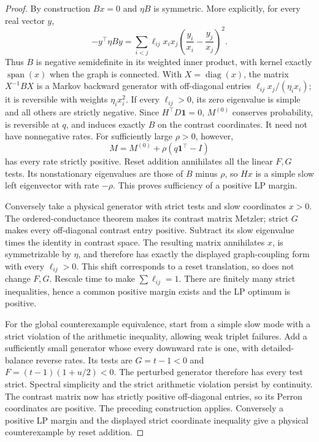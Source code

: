 \documentclass[11pt]{article}
\begin{document}
\begin{proof}
By construction $Bx=0$ and $\eta B$ is symmetric. More explicitly,
for every real vector $y$,
\[
-y^\top\eta B y=\sum_{i<j}\ell_{ij}x_ix_j
 \left(\frac{y_i}{x_i}-\frac{y_j}{x_j}\right)^2.
\]
Thus $B$ is negative semidefinite in its weighted inner product, with
kernel exactly $\operatorname{span}(x)$ when the graph is connected. With
$X=\operatorname{diag}(x)$, the matrix $X^{-1}BX$ is a Markov backward
generator with off-diagonal entries
$\ell_{ij}x_j/(\eta_i x_i)$; it is reversible with weights
$\eta_i x_i^2$. If every $\ell_{ij}>0$, its zero eigenvalue is simple
and all others are strictly negative. Since $H^\top D\mathbf1=0$,
$M^{(0)}$ conserves probability, is reversible at $q$, and induces exactly
$B$ on the contrast coordinates. It need not have nonnegative rates.
For sufficiently large $\rho>0$, however,
\[
M=M^{(0)}+\rho(q\mathbf1^\top-I)
\]
has every rate strictly positive. Reset addition annihilates all the
linear $F,G$ tests. Its nonstationary eigenvalues are those of $B$ minus
$\rho$, so $Hx$ is a simple slow left eigenvector with rate $-\rho$.
This proves sufficiency of a positive LP margin.

Conversely take a physical generator with strict tests and slow
coordinates $x>0$. The ordered-conductance theorem makes its contrast
matrix Metzler; strict $G$ makes every off-diagonal contrast entry
positive. Subtract its slow eigenvalue times the identity in contrast
space. The resulting matrix annihilates $x$, is symmetrizable by
$\eta$, and therefore has exactly the displayed graph-coupling form
with every $\ell_{ij}>0$. This shift corresponds to a reset translation,
so does not change $F,G$. Rescale time to make $\sum\ell_{ij}=1$.
There are finitely many strict inequalities, hence a common positive
margin exists and the LP optimum is positive.

For the global counterexample equivalence, start from a simple slow
mode with a strict violation of the arithmetic inequality, allowing
weak triplet failures. Add a sufficiently small generator whose every
downward rate is one, with detailed-balance reverse rates. Its tests
are $G=t-1<0$ and $F=(t-1)(1+u/2)<0$. The perturbed generator therefore
has every test strict. Spectral simplicity and the strict arithmetic
violation persist by continuity. The contrast matrix now has strictly
positive off-diagonal entries, so its Perron coordinates are positive.
The preceding construction applies. Conversely a positive LP margin
and the displayed strict coordinate inequality give a physical
counterexample by reset addition.


\end{proof}
\end{document}
